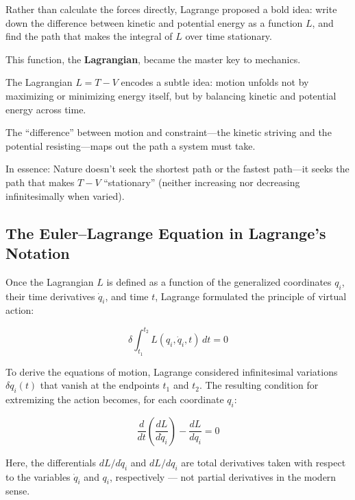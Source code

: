 Rather than calculate the forces directly, Lagrange proposed a bold idea:  
write down the difference between kinetic and potential energy as a function \( L \), and find the path that makes the integral of \( L \) over time stationary.

This function, the \textbf{Lagrangian}, became the master key to mechanics.

\begin{tcolorbox}[colback=gray!5!white, colframe=black, title=\textbf{Historical Sidebar: Why Subtract \( V \) from \( T \)?}, fonttitle=\bfseries, arc=1.5mm, boxrule=0.4pt]

The Lagrangian \( L = T - V \) encodes a subtle idea: motion unfolds not by maximizing or minimizing energy itself, but by balancing kinetic and potential energy across time.

The “difference” between motion and constraint—the kinetic striving and the potential resisting—maps out the path a system must take.

In essence: Nature doesn’t seek the shortest path or the fastest path—it seeks the path that makes \( T - V \) “stationary” (neither increasing nor decreasing infinitesimally when varied).
\end{tcolorbox}



\subsection{The Euler--Lagrange Equation in Lagrange’s Notation}

Once the Lagrangian \( L \) is defined as a function of the generalized coordinates \( q_i \), their time derivatives \( \dot{q}_i \), and time \( t \), Lagrange formulated the principle of virtual action:

\[
\delta \int_{t_1}^{t_2} L(q_i, \dot{q}_i, t)\, dt = 0
\]

To derive the equations of motion, Lagrange considered infinitesimal variations \( \delta q_i(t) \) that vanish at the endpoints \( t_1 \) and \( t_2 \). The resulting condition for extremizing the action becomes, for each coordinate \( q_i \):

\[
\frac{d}{dt} \left( \frac{dL}{d\dot{q}_i} \right) - \frac{dL}{dq_i} = 0
\]

Here, the differentials \( dL/d\dot{q}_i \) and \( dL/dq_i \) are total derivatives taken with respect to the variables \( \dot{q}_i \) and \( q_i \), respectively — not partial derivatives in the modern sense.

